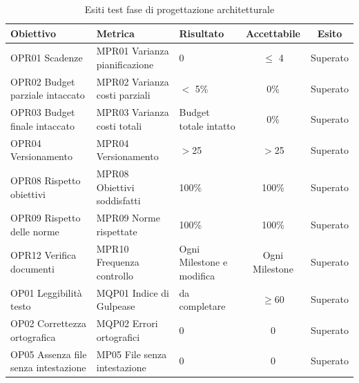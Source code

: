 \documentclass[../piano_di_qualifica.tex]{subfiles}
\begin{document}
\begin{table}[!ht]
	\centering
	\begin{tabular}{|p{4cm}|p{4cm}|l|c|c|}
		\hline
		\rowcolor{lightgray}
		\textbf{Obiettivo}            			& \textbf{Metrica}              & \textbf{Risultato}                    & \textbf{Accettabile} & \textbf{Esito} \\
		\hline
		OPR01 Scadenze		        			& MPR01 Varianza pianificazione & 0                             		& $\leq$ 4           	& Superato   \\
		OPR02 Budget parziale intaccato        	& MPR02 Varianza costi parziali & $<$ 5\%								& 0\%                  & Superato   \\
		OPR03 Budget finale intaccato        	& MPR03 Varianza costi totali   & Budget totale intatto					& 0\%                  & Superato       \\
		OPR04 Versionamento						& MPR04 Versionamento			& $>$25									&$>$25					& Superato	\\
		OPR08 Rispetto obiettivi      			& MPR08 Obiettivi soddisfatti   & 100\%                                 & 100\%                & Superato       \\
		OPR09 Rispetto delle norme   			& MPR09 Norme rispettate        & 100\%                                 & 100\%                & Superato       \\
		OPR12 Verifica documenti      			& MPR10 Frequenza controllo     & Ogni Milestone e modifica         	& Ogni Milestone       & Superato       \\
		OP01 Leggibilità testo       			& MQP01 Indice di Gulpease      & da completare                         & \(\ge 60\)           & Superato       \\
		OP02 Correttezza ortografica 			& MQP02 Errori ortografici      & 0                                     & 0                    & Superato       \\
		OP05 Assenza file senza intestazione	& MP05 File senza intestazione 	& 0										& 0						& Superato		\\
		\hline
	\end{tabular}
	\caption{Esiti test fase di progettazione architetturale}
\end{table}
\end{document}
